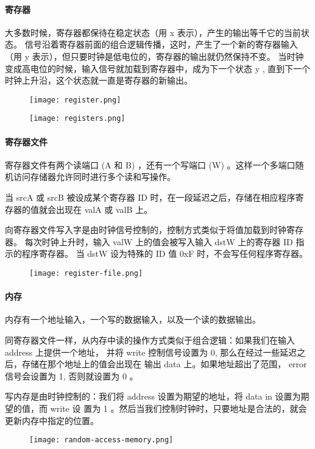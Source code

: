 \paragraph{寄存器}
大多数时候，寄存器都保待在稳定状态（用 x 表示），产生的输出等千它的当前状态。
信号沿着寄存器前面的组合逻辑传播，这时，产生了一个新的寄存器输入（用 y 表示），但只要时钟是低电位的，寄存器的输出就仍然保持不变。
当时钟变成高电位的时候，输入信号就加载到寄存器中，成为下一个状态 y , 直到下一个时钟上升沿，这个状态就一直是寄存器的新输出。
\begin{figure}[H]
    \centering
    \texttt{[image: register.png]}
\end{figure}
\begin{figure}[H]
    \centering
    \texttt{[image: registers.png]}
\end{figure}

\paragraph{寄存器文件}
寄存器文件有两个读端口 (A 和 B) ，还有一个写端口 (W) 。这样一个多端口随机访问存储器允许同时进行多个读和写操作。

当 srcA 或 srcB 被设成某个寄存器 ID 时，在一段延迟之后，存储在相应程序寄存器的值就会出现在 valA 或 valB 上。

向寄存器文件写入字是由时钟信号控制的，控制方式类似于将值加载到时钟寄存器。
每次时钟上升时，输入 valW 上的值会被写入输入 dstW 上的寄存器 ID 指示的程序寄存器。
当 dstW 设为特殊的 ID 值 0xF 时，不会写任何程序寄存器。
\begin{figure}[H]
    \centering
    \texttt{[image: register-file.png]}
\end{figure}

\paragraph{内存}

内存有一个地址输入，一个写的数据输入，以及一个读的数据输出。

同寄存器文件一样，从内存中读的操作方式类似于组合逻辑：如果我们在输入 address 上提供一个地址，
并将 write 控制信号设置为 0, 那么在经过一些延迟之后，存储在那个地址上的值会出现在
输出 data 上。如果地址超出了范围， error 信号会设置为 1, 否则就设置为 0 。

写内存是由时钟控制的：我们将 address 设置为期望的地址，将 data in 设置为期望的值，而 write 设
置为 1 。然后当我们控制时钟时，只要地址是合法的，就会更新内存中指定的位置。
\begin{figure}[H]
    \centering
    \texttt{[image: random-access-memory.png]}
\end{figure}





















\newpage